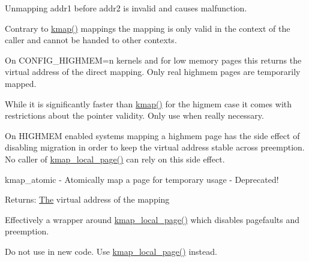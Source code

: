 Unmapping addr1 before addr2 is invalid and causes malfunction.

Contrary to \mbox{\hyperlink{include_2linux_2highmem_8h_a628341c170d47e771c023c419d0416b9}{kmap()}} mappings the mapping is only valid in the context of the caller and cannot be handed to other contexts.

On C\+O\+N\+F\+I\+G\+\_\+\+H\+I\+G\+H\+M\+EM=n kernels and for low memory pages this returns the virtual address of the direct mapping. Only real highmem pages are temporarily mapped.

While it is significantly faster than \mbox{\hyperlink{include_2linux_2highmem_8h_a628341c170d47e771c023c419d0416b9}{kmap()}} for the higmem case it comes with restrictions about the pointer validity. Only use when really necessary.

On H\+I\+G\+H\+M\+EM enabled systems mapping a highmem page has the side effect of disabling migration in order to keep the virtual address stable across preemption. No caller of \mbox{\hyperlink{include_2linux_2highmem_8h_aabdbf9cd91e3746d09f067ef372d06ed}{kmap\+\_\+local\+\_\+page()}} can rely on this side effect.

kmap\+\_\+atomic -\/ Atomically map a page for temporary usage -\/ Deprecated!

Returns\+: \mbox{\hyperlink{classThe}{The}} virtual address of the mapping

Effectively a wrapper around \mbox{\hyperlink{include_2linux_2highmem_8h_aabdbf9cd91e3746d09f067ef372d06ed}{kmap\+\_\+local\+\_\+page()}} which disables pagefaults and preemption.

Do not use in new code. Use \mbox{\hyperlink{include_2linux_2highmem_8h_aabdbf9cd91e3746d09f067ef372d06ed}{kmap\+\_\+local\+\_\+page()}} instead. 